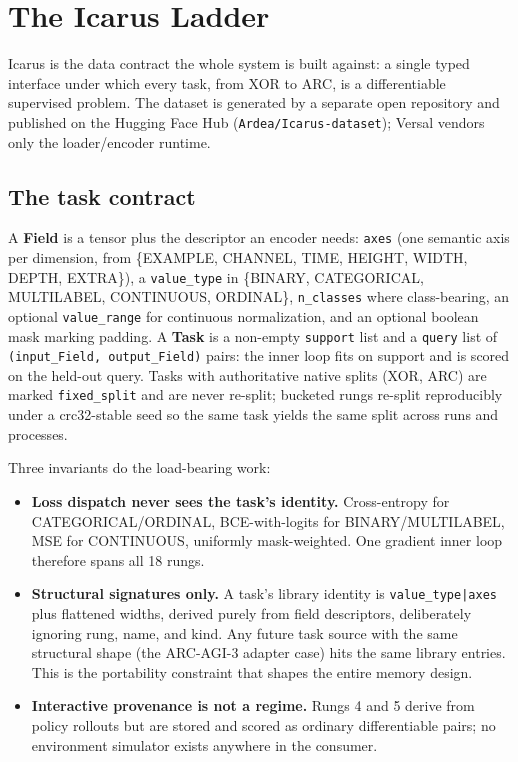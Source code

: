 \documentclass[11pt]{article}
\begin{document}
\section{The Icarus Ladder}

Icarus is the data contract the whole system is built against: a single typed interface under which every task, from XOR to ARC, is a differentiable supervised problem. The dataset is generated by a separate open repository and published on the Hugging Face Hub (\texttt{Ardea/Icarus-dataset}); Versal vendors only the loader/encoder runtime.

\subsection{The task contract}

A \textbf{Field} is a tensor plus the descriptor an encoder needs: \texttt{axes} (one semantic axis per dimension, from \{EXAMPLE, CHANNEL, TIME, HEIGHT, WIDTH, DEPTH, EXTRA\}), a \texttt{value_type} in \{BINARY, CATEGORICAL, MULTILABEL, CONTINUOUS, ORDINAL\}, \texttt{n_classes} where class-bearing, an optional \texttt{value_range} for continuous normalization, and an optional boolean mask marking padding. A \textbf{Task} is a non-empty \texttt{support} list and a \texttt{query} list of \texttt{(input_Field, output_Field)} pairs: the inner loop fits on support and is scored on the held-out query. Tasks with authoritative native splits (XOR, ARC) are marked \texttt{fixed_split} and are never re-split; bucketed rungs re-split reproducibly under a crc32-stable seed so the same task yields the same split across runs and processes.

Three invariants do the load-bearing work:

\begin{itemize}[leftmargin=*]
\item \textbf{Loss dispatch never sees the task's identity.} Cross-entropy for CATEGORICAL/ORDINAL, BCE-with-logits for BINARY/MULTILABEL, MSE for CONTINUOUS, uniformly mask-weighted. One gradient inner loop therefore spans all 18 rungs.
\item \textbf{Structural signatures only.} A task's library identity is \texttt{value_type|axes} plus flattened widths, derived purely from field descriptors, deliberately ignoring rung, name, and kind. Any future task source with the same structural shape (the ARC-AGI-3 adapter case) hits the same library entries. This is the portability constraint that shapes the entire memory design.
\item \textbf{Interactive provenance is not a regime.} Rungs 4 and 5 derive from policy rollouts but are stored and scored as ordinary differentiable pairs; no environment simulator exists anywhere in the consumer.
\end{itemize}
\end{document}
